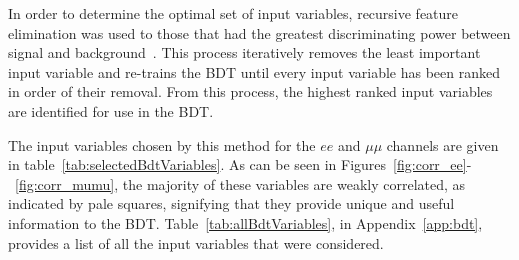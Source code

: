 In order to determine the optimal set of input variables, recursive feature elimination was used to those that had the greatest discriminating power between signal and background~\cite{Guyon2002}.
This process iteratively removes the least important input variable and re-trains the BDT until every input variable has been ranked in order of their removal.
From this process, the highest ranked input variables are identified for use in the BDT.

The input variables chosen by this method for the $ee$ and $\mu\mu$ channels are given in table~\ref{tab:selectedBdtVariables}.
As can be seen in Figures~\ref{fig:corr_ee}-~\ref{fig:corr_mumu}, the majority of these variables are weakly correlated, as indicated by pale squares, signifying that they provide unique and useful information to the BDT.
Table~\ref{tab:allBdtVariables}, in Appendix~\ref{app:bdt}, provides a list of all the input variables that were considered.

